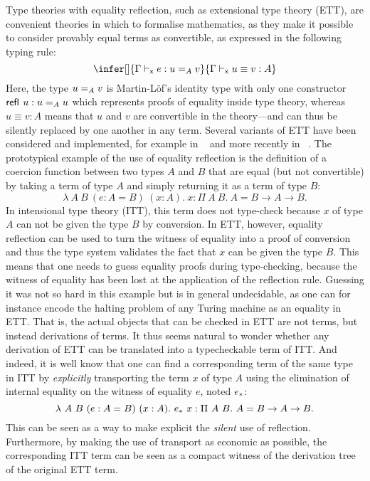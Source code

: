 Type theories with equality reflection, such as extensional type
theory (ETT), are convenient theories in which to formalise
mathematics, as they make it possible to consider provably equal terms as
convertible, as expressed in the following typing rule:
%
\begin{equation}
  \label{eq:reflection}
  \infer[]
    {\xisterm{\Ga}{e}{\Eq{A}{u}{v}}}
    {\xeqterm{\Ga}{u}{v}{A}}
\end{equation}
%
Here, the type $\Eq{A}{u}{v}$ is Martin-Löf's identity type with only
one constructor $\refl{} u : \Eq{A}{u}{u}$ which represents
proofs of equality inside type theory, whereas $u \equiv v : A$ means
that $u$ and $v$ are convertible in the theory---and can thus be
silently replaced by one another in any term.
%
Several variants of ETT have been considered and implemented, for
example in \NuPRL{}~ and more recently in
\Andromeda~.
%
The prototypical example of the use of equality reflection is the
definition of a coercion function between two types $A$ and $B$ that
are equal (but not convertible) by taking a term of type $A$ and
simply returning it as a term of type $B$:
\[
\lambda\ A\ B \ (e:A = B)\ (x:A).\ x
: \Pi\ A\ B.\ A = B \to A \to B.
\]
%
%
In intensional type theory (ITT), this term does not type-check
because $x$ of type $A$ can not be given the type $B$ by conversion.
%
In ETT, however, equality reflection can be used to turn the witness
of equality into a proof of conversion and thus the type system
validates the fact that $x$ can be given the type $B$.
%
This means that one needs to guess equality proofs
during type-checking, because the witness of equality has been lost at
the application of the reflection rule. Guessing it was not so hard in this
example but is in general undecidable, as one can for instance encode the
halting problem of any Turing machine as an equality in ETT.
%
That is, the actual objects that can be checked in ETT are not terms,
but instead derivations of terms.
%
It thus seems natural to wonder whether any derivation of ETT can be
translated into a typecheckable term of ITT.
%
And indeed, it is well know that one can find a corresponding term of
the same type in ITT by \emph{explicitly} transporting the term $x$
of type $A$ using the elimination of internal equality on the witness
of equality $e$, noted $\translpo{e}$:
%
\[
  \lambda\ A\ B \ (e:A = B)\ (x:A).\ \translpo{e}\ x
  : \Pi\ A\ B.\ A = B \to A \to B.
\]
%
This can be seen as a way to make explicit the \emph{silent} use of
reflection.
%
Furthermore, by making the use of transport as economic as possible,
the corresponding ITT term can be seen as a compact witness of the
derivation tree of the original ETT term.

